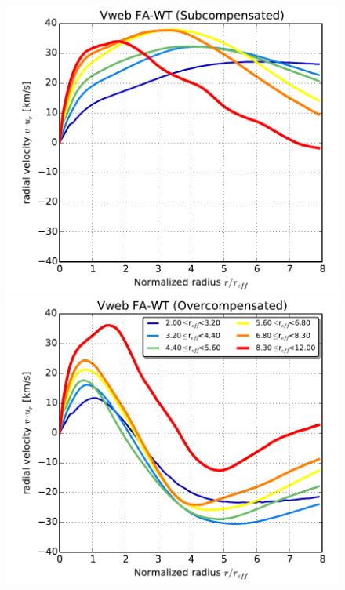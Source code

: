 \documentclass[a4,useAMS,usenatbib,usegraphicx]{mn2e}
\begin{document}
\begin{figure}
  \includegraphics[trim = 2mm 2mm 5mm 0mm, clip, keepaspectratio=true,
  width=0.35\textheight]{voids_velocity_VwebFAG0.pdf}
  \includegraphics[trim = 2mm 2mm 5mm 0mm, clip, keepaspectratio=true,
  width=0.35\textheight]{voids_velocity_VwebFAG1.pdf}
  \label{fig:velocity_profile}
  \vspace{0.1 cm}
\end{figure}
\end{document}
